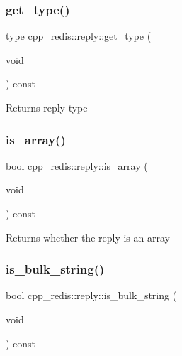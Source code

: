 \subsubsection{\texorpdfstring{get\+\_\+type()}{get\_type()}}
{\footnotesize\ttfamily \mbox{\hyperlink{classcpp__redis_1_1reply_acc272b2a52164cac1d110c619a0b25bd}{type}} cpp\+\_\+redis\+::reply\+::get\+\_\+type (\begin{DoxyParamCaption}\item[{void}]{ }\end{DoxyParamCaption}) const}

\begin{DoxyReturn}{Returns}
reply type 
\end{DoxyReturn}
\mbox{\label{classcpp__redis_1_1reply_a3a94881a46125d281cb36191c4b7d19a}} 
\subsubsection{\texorpdfstring{is\+\_\+array()}{is\_array()}}
{\footnotesize\ttfamily bool cpp\+\_\+redis\+::reply\+::is\+\_\+array (\begin{DoxyParamCaption}\item[{void}]{ }\end{DoxyParamCaption}) const}

\begin{DoxyReturn}{Returns}
whether the reply is an array 
\end{DoxyReturn}
\mbox{\label{classcpp__redis_1_1reply_ab1f4e57a33fb438ab165a65f2d31ca8d}} 
\subsubsection{\texorpdfstring{is\+\_\+bulk\+\_\+string()}{is\_bulk\_string()}}
{\footnotesize\ttfamily bool cpp\+\_\+redis\+::reply\+::is\+\_\+bulk\+\_\+string (\begin{DoxyParamCaption}\item[{void}]{ }\end{DoxyParamCaption}) const}

